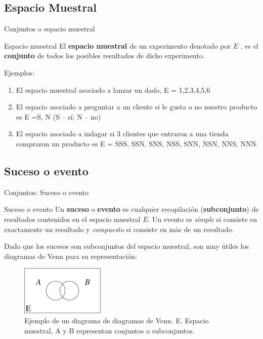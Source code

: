 \documentclass[11pt]{beamer}
\begin{document}
      \subsection*{Espacio Muestral}
      \begin{frame}{Conjuntos o espacio muestral}
          \begin{block}{Espacio muestral}
              El \textbf{espacio muestral} de un experimento denotado por $E$ , es el \textbf{conjunto} de todos los posibles resultados de dicho experimento.
          \end{block}
          \pause
          Ejemplos:
          \begin{enumerate}[<+->]
              \item El espacio muestral asociado a lanzar un dado, E = {1,2,3,4,5,6}
              \item El espacio asociado a preguntar a un cliente si le gusta o no nuestro producto es E ={S, N} (S – sí; N – no)
              \item El espacio asociado a indagar si 3 clientes que entraron a una tienda compraron un producto es E = {SSS, SSN, SNS, NSS, SNN, NSN, NNS, NNN}.
          \end{enumerate}
      \end{frame}
      \subsection*{Suceso o evento}
      \begin{frame}{Conjuntos: Suceso o evento}
          \begin{block}{Suceso o evento}
              Un \textbf{suceso} o \textbf{evento} es cualquier recopilación (\textbf{subconjunto}) de resultados contenidos en el espacio muestral $E$. Un evento es \textit{simple} si consiste en exactamente un resultado y \textit{compuesto} si consiste en más de un resultado.
          \end{block}
          \pause
          Dado que los sucesos son subconjuntos del espacio muestral, son muy útiles los diagramas de Venn para su representación:
          \begin{figure}
              \centering
              \includegraphics[width=0.3\linewidth]{images/estadistica1}
              \caption{Ejemplo de un diagrama de diagramas de Venn. E. Espacio muestral, A y B representan conjuntos o subconjuntos. }
              \label{fig:estadistica1}
          \end{figure}
      \end{frame}
\end{document}
